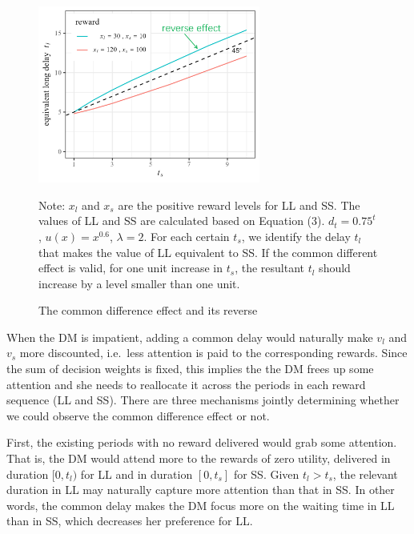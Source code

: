 \documentclass[
  12pt,
]{article}
\begin{document}
\begin{figure}[h]
  \centering   
  \includegraphics[width=0.65\textwidth]{figures/common_diff.png}   
  \caption{The common difference effect and its reverse}
  \vspace{8pt}
  \begin{minipage}{1.0\textwidth}
{\par\footnotesize Note: $x_l$ and $x_s$ are the positive reward levels for LL and SS. The values of LL and SS are calculated based on Equation (3). $d_t=0.75^t$, $u(x)=x^{0.6}$, $\lambda=2$. For each certain $t_s$, we identify the delay $t_l$ that makes the value of LL equivalent to SS. If the common different effect is valid, for one unit increase in $t_s$, the resultant $t_l$ should increase by a level smaller than one unit. }
\end{minipage}
  \label{fig:common_diff} 
\end{figure}

When the DM is impatient, adding a common delay would naturally make
\(v_l\) and \(v_s\) more discounted, i.e.~less attention is paid to the
corresponding rewards. Since the sum of decision weights is fixed, this
implies the the DM frees up some attention and she needs to reallocate
it across the periods in each reward sequence (LL and SS). There are
three mechanisms jointly determining whether we could observe the common
difference effect or not.

First, the existing periods with no reward delivered would grab some
attention. That is, the DM would attend more to the rewards of zero
utility, delivered in duration \([0,t_l)\) for LL and in duration
\([0,t_s]\) for SS. Given \(t_l >t_s\), the relevant duration in LL may
naturally capture more attention than that in SS. In other words, the
common delay makes the DM focus more on the waiting time in LL than in
SS, which decreases her preference for LL.
\end{document}
